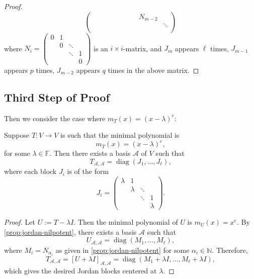\begin{proof}
$$\begin{pmatrix}
    & & & & & & & & N_{m-2} \\
    & & & & & & & & & \ddots \\
\end{pmatrix}$$
where $N_i = \begin{pmatrix}
0 & 1       &        &        \\
        & 0 & \ddots &        \\
        &         & \ddots & 1      \\
        &         &        & 0
\end{pmatrix}$ is an $i \times i$-matrix, and $J_m$ appears $\ell$ times, $J_{m-1}$ appears $p$ times, $J_{m-2}$ appears $q$ times in the above matrix.
\end{proof}

\subsection{Third Step of Proof}
Then we consider the case where \({m}_{T}\left( x\right)  = {\left( x - \lambda \right) }^{e}\):
\begin{corollary}
Suppose \( T : V \to V \) is such that the minimal polynomial is
\[
m_T(x) = (x - \lambda)^e,
\]
for some \( \lambda \in \mathbb{F} \). Then there exists a basis \( \mathcal{A} \) of \( V \) such that
\[
T_{\mathcal{A}, \mathcal{A}} = \operatorname{diag}(J_1, \ldots, J_\ell),
\]
where each block \( J_i \) is of the form
\[
J_i = \begin{pmatrix}
\lambda & 1       &        &        \\
        & \lambda & \ddots &        \\
        &         & \ddots & 1      \\
        &         &        & \lambda
\end{pmatrix}.
\]
\end{corollary}

\begin{proof}
Let \( U := T - \lambda I \). Then the minimal polynomial of \( U \) is \( m_U(x) = x^e \). By \autoref{prop:jordan-nilpotent}, there exists a basis \( \mathcal{A} \) such that
\[
U_{\mathcal{A}, \mathcal{A}} = \operatorname{diag}(M_1, \ldots, M_\ell),
\]
where $M_i = N_{\alpha_i}$ as given in \autoref{prop:jordan-nilpotent} for some $\alpha_i \in \mathbb{N}$.  Therefore,
\[
T_{\mathcal{A}, \mathcal{A}} = [U + \lambda I]_{\mathcal{A}, \mathcal{A}} = \operatorname{diag}(M_1 + \lambda I, \ldots, M_\ell + \lambda I),
\]
which gives the desired Jordan blocks centered at \( \lambda \).
\end{proof}

